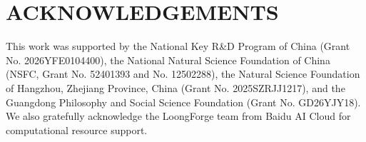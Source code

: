 \documentclass[letterpaper, 10pt, conference]{ieeeconf}
\begin{document}
\section*{ACKNOWLEDGEMENTS}
This work was supported by the National Key R\&D Program of China (Grant No. 2026YFE0104400), the National Natural Science Foundation of China (NSFC, Grant No. 52401393 and No. 12502288), the Natural Science Foundation of Hangzhou, Zhejiang Province, China (Grant No. 2025SZRJJ1217), and the Guangdong Philosophy and Social Science Foundation (Grant No. GD26YJY18). We also gratefully acknowledge the LoongForge team from Baidu AI Cloud for computational resource support.



\end{document}
